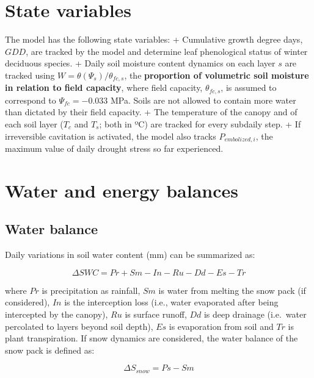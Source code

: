 \documentclass[]{book}
\begin{document}
\hypertarget{state-variables-1}{%
\section{State variables}\label{state-variables-1}}

The model has the following state variables:
+ Cumulative growth degree days, \(GDD\), are tracked by the model and determine leaf phenological status of winter deciduous species.
+ Daily soil moisture content dynamics on each layer \(s\) are tracked using \(W = \theta(\Psi_s)/ \theta_{fc,s}\), the \textbf{proportion of volumetric soil moisture in relation to field capacity}, where field capacity, \(\theta_{fc,s}\), is assumed to correspond to \(\Psi_{fc} = -0.033\) MPa. Soils are not allowed to contain more water than dictated by their field capacity.
+ The temperature of the canopy and of each soil layer (\(T_c\) and \(T_s\); both in ºC) are tracked for every subdaily step.
+ If irreversible cavitation is activated, the model also tracks \(P_{embolized,i}\), the maximum value of daily drought stress so far experienced.

\hypertarget{water-and-energy-balances}{%
\section{Water and energy balances}\label{water-and-energy-balances}}

\hypertarget{water-balance-1}{%
\subsection{Water balance}\label{water-balance-1}}

Daily variations in soil water content (mm) can be summarized as:

\begin{equation}
\Delta{SWC} = Pr + Sm - In - Ru - Dd - Es -Tr
\end{equation}

where \(Pr\) is precipitation as rainfall, \(Sm\) is water from melting the snow pack (if considered), \(In\) is the interception loss (i.e., water evaporated after being intercepted by the canopy), \(Ru\) is surface runoff, \(Dd\) is deep drainage (i.e.~water percolated to layers beyond soil depth), \(Es\) is evaporation from soil and \(Tr\) is plant transpiration. If snow dynamics are considered, the water balance of the snow pack is defined as:

\begin{equation}
\Delta{S_{snow}} = Ps - Sm
\end{equation}
\end{document}
